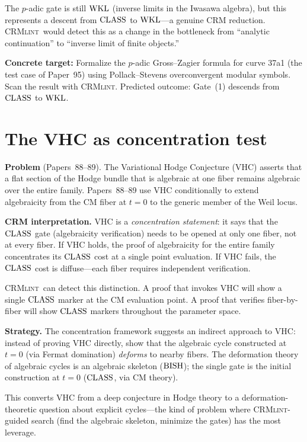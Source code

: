 \documentclass[11pt,a4paper]{article}
\theoremstyle{plain}
\theoremstyle{definition}
\newcommand{\BISH}{\textup{BISH}}
\newcommand{\WKL}{\textup{WKL}}
\newcommand{\CLASS}{\textup{CLASS}}
\newcommand{\CRMlint}{\textsc{CRMlint}}
\begin{document}
The $p$-adic gate is still $\WKL$ (inverse limits in the Iwasawa
algebra), but this represents a descent from $\CLASS$ to $\WKL$---a
genuine CRM reduction.  \CRMlint\ would detect this as a change in
the bottleneck from ``analytic continuation'' to ``inverse limit of
finite objects.''

\medskip
\noindent\textbf{Concrete target:} Formalize the $p$-adic Gross--Zagier
formula for curve 37a1 (the test case of Paper~95) using Pollack--Stevens
overconvergent modular symbols.  Scan the result with \CRMlint.
Predicted outcome: Gate~(1) descends from $\CLASS$ to $\WKL$.

\section{The VHC as concentration test}\label{sec:vhc}

\noindent\textbf{Problem} (Papers~88--89).
The Variational Hodge Conjecture (VHC) asserts that a flat section
of the Hodge bundle that is algebraic at one fiber remains algebraic
over the entire family.  Papers~88--89 use VHC conditionally to
extend algebraicity from the CM fiber at $t = 0$ to the generic
member of the Weil locus.

\medskip
\noindent\textbf{CRM interpretation.}
VHC is a \emph{concentration statement}: it says that the $\CLASS$
gate (algebraicity verification) needs to be opened at only one
fiber, not at every fiber.  If VHC holds, the proof of algebraicity
for the entire family concentrates its $\CLASS$ cost at a single
point evaluation.  If VHC fails, the $\CLASS$ cost is diffuse---each
fiber requires independent verification.

\CRMlint\ can detect this distinction.  A proof that invokes VHC
will show a single $\CLASS$ marker at the CM evaluation point.
A proof that verifies fiber-by-fiber will show $\CLASS$ markers
throughout the parameter space.

\medskip
\noindent\textbf{Strategy.}
The concentration framework suggests an indirect approach to VHC:
instead of proving VHC directly, show that the algebraic cycle
constructed at $t = 0$ (via Fermat domination) \emph{deforms} to
nearby fibers.  The deformation theory of algebraic cycles is an
algebraic skeleton ($\BISH$); the single gate is the initial
construction at $t = 0$ ($\CLASS$, via CM theory).

This converts VHC from a deep conjecture in Hodge theory to a
deformation-theoretic question about explicit cycles---the kind
of problem where \CRMlint-guided search (find the algebraic
skeleton, minimize the gates) has the most leverage.
\end{document}
